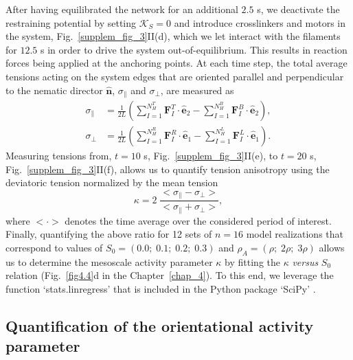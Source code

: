 After having equilibrated the network for an additional $2.5$ \si{\second}, we deactivate the restraining potential by setting $\mathcal{K}_S = 0$ and introduce crosslinkers and motors in the system, Fig.~\ref{supplem_fig_3}II(d), which we let interact with the filaments for $12.5$ \si{\second} in order to drive the system out-of-equilibrium. This results in reaction forces being applied at the anchoring points. At each time step, the total average tensions acting on the system edges that are oriented parallel and perpendicular to the nematic director $\bm{\hat{n}}$, $\sigma_\parallel$ and $\sigma_\perp$, are measured as 
\begin{equation}\label{eq:edgeTractions}
	\begin{aligned}
		\sigma_{\parallel} &= \frac{1}{2L} \left( \sum_{I=1}^{N_H^T}{\bm{F}_I^T \cdot \hat{\bm{e}}_2} - \sum_{I=1}^{N_H^B}{\bm{F}_I^B \cdot \hat{\bm{e}}_2} \right), \\
		\sigma_{\perp} &= \frac{1}{2L} \left( \sum_{I=1}^{N_H^R}{\bm{F}_I^R \cdot \hat{\bm{e}}_1} - \sum_{I=1}^{N_H^L}{\bm{F}_I^L \cdot \hat{\bm{e}}_1} \right).
	\end{aligned}
\end{equation}
Measuring tensions from, $t = 10$ \si{\second}, Fig.~\ref{supplem_fig_3}II(e), to $t = 20$ \si{\second}, Fig.~\ref{supplem_fig_3}II(f), allows us to quantify tension anisotropy using the deviatoric tension normalized by the mean tension
\begin{equation}\label{eq:ForceAnisotropy}
	\kappa = 2 \; \frac{<\sigma_{\parallel} - \sigma_{\perp}>}{<\sigma_{\parallel} + \sigma_{\perp}>},
\end{equation}
where $< \cdot >$ denotes the time average over the considered period of interest.
Finally, quantifying the above ratio for 12 sets of $n = 16$ model realizations that correspond to values of $S_0 = (0.0; \; 0.1; \; 0.2; \; 0.3)$ and $\rho_A = (\rho; \; 2\rho; \; 3\rho)$ allows us to determine the mesoscale activity parameter $\kappa$ by fitting the $\kappa$ \textit{versus} $S_0$ relation (Fig.~\ref{fig4.4}d in the Chapter~\ref{chap_4}). To this end, we leverage the function `stats.linregress' that is included in the Python package `SciPy' \cite{scipy2001}.



\subsection{\label{sec:MomentTests}Quantification of the orientational activity parameter}

